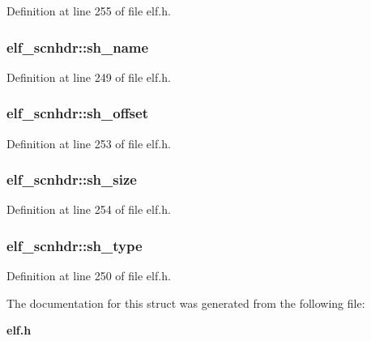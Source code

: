 Definition at line 255 of file elf.h.
\subsubsection[{sh\_\-name}]{ {\bf elf\_\-scnhdr::sh\_\-name}}\label{structelf__scnhdr_ea03066d456640b9b666373718d4c838}




Definition at line 249 of file elf.h.
\subsubsection[{sh\_\-offset}]{ {\bf elf\_\-scnhdr::sh\_\-offset}}\label{structelf__scnhdr_a568c81fbfd092207a69baa100c99a58}




Definition at line 253 of file elf.h.
\subsubsection[{sh\_\-size}]{ {\bf elf\_\-scnhdr::sh\_\-size}}\label{structelf__scnhdr_9efb50dbb8e965197c26c0e242284eb6}




Definition at line 254 of file elf.h.
\subsubsection[{sh\_\-type}]{ {\bf elf\_\-scnhdr::sh\_\-type}}\label{structelf__scnhdr_25a11718f5bcdb665f46a882459f65f8}




Definition at line 250 of file elf.h.

The documentation for this struct was generated from the following file:\begin{CompactItemize}
\item 
{\bf elf.h}\end{CompactItemize}
